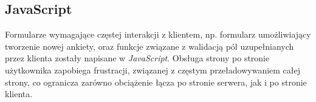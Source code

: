 \subsection{JavaScript}
\label{Chapter63b}

Formularze wymagające częstej interakcji z klientem, np. formularz umożliwiający tworzenie nowej ankiety, oraz funkcje związane z walidacją pól uzupełnianych przez klienta zostały napisane w \emph{JavaScript}. Obsługa strony po stronie użytkownika zapobiega frustracji, związanej z częstym przeładowywaniem całej strony, co ogranicza zarówno obciążenie łącza po stronie serwera, jak i po stronie klienta.